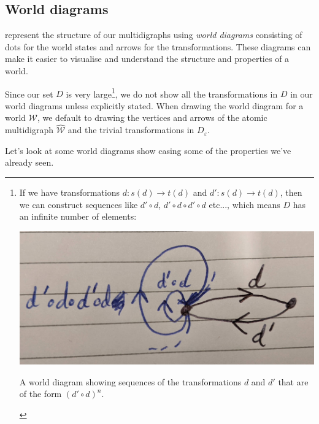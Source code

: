 \subsection{World diagrams}

 represent the structure of our multidigraphs using \emph{world diagrams} consisting of dots for the world states and arrows for the transformations.
These diagrams can make it easier to visualise and understand the structure and properties of a world.

Since our set $D$ is very large\footnote{
	If we have transformations $d: s(d) \to t(d)$ and $d': s(d) \to t(d)$, then we can construct sequences like $d' \circ d$, $d' \circ d \circ d' \circ d$ etc..., which means $D$ has an infinite number of elements:
	\begin{center}
		\FloatBarrier
		\captionsetup{type=figure}
		\includegraphics[width=1.0\linewidth]{2MathematicalFramework/Images/D_commonly_large.jpg}
		\caption{A world diagram showing sequences of the transformations $d$ and $d'$ that are of the form $(d' \circ d)^{n}$.}
	\end{center}
}, we do not show all the transformations in $D$ in our world diagrams unless explicitly stated.
When drawing the world diagram for a world $\mathscr{W}$, we default to drawing the vertices and arrows of the atomic multidigraph $\hat{\mathscr{W}}$ and the trivial transformations in $D_{\varepsilon}$.

Let's look at some world diagrams show casing some of the properties we've already seen.

